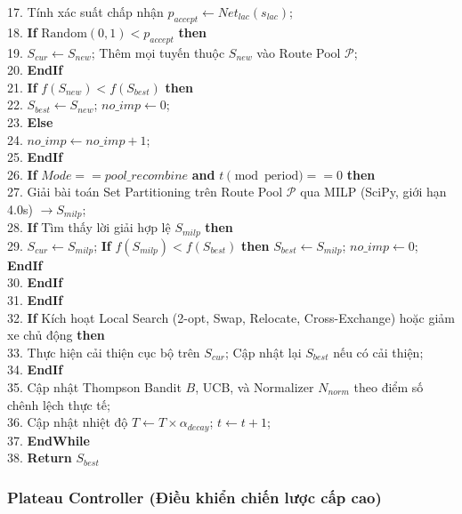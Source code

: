 \documentclass[13pt,a4paper]{extarticle}
\begin{document}
\begin{tabbing}
17. \qquad Tính xác suất chấp nhận $p_{accept} \leftarrow Net_{lac}(s_{lac})$; \\
18. \qquad \textbf{If} $\text{Random}(0, 1) < p_{accept}$ \textbf{then} \\
19. \qquad\qquad $S_{cur} \leftarrow S_{new}$; Thêm mọi tuyến thuộc $S_{new}$ vào Route Pool $\mathcal{P}$; \\
20. \qquad \textbf{EndIf} \\
21. \qquad \textbf{If} $f(S_{new}) < f(S_{best})$ \textbf{then} \\
22. \qquad\qquad $S_{best} \leftarrow S_{new}$; $no\_imp \leftarrow 0$; \\
23. \qquad \textbf{Else} \\
24. \qquad\qquad $no\_imp \leftarrow no\_imp + 1$; \\
25. \qquad \textbf{EndIf} \\
26. \qquad \textbf{If} $Mode == pool\_recombine$ \textbf{and} $t \pmod{\text{period}} == 0$ \textbf{then} \\
27. \qquad\qquad Giải bài toán Set Partitioning trên Route Pool $\mathcal{P}$ qua MILP (SciPy, giới hạn 4.0s) $\to S_{milp}$; \\
28. \qquad\qquad \textbf{If} Tìm thấy lời giải hợp lệ $S_{milp}$ \textbf{then} \\
29. \qquad\qquad\qquad $S_{cur} \leftarrow S_{milp}$; \textbf{If} $f(S_{milp}) < f(S_{best})$ \textbf{then} $S_{best} \leftarrow S_{milp}$; $no\_imp \leftarrow 0$; \textbf{EndIf} \\
30. \qquad\qquad \textbf{EndIf} \\
31. \qquad \textbf{EndIf} \\
32. \qquad \textbf{If} Kích hoạt Local Search (2-opt, Swap, Relocate, Cross-Exchange) hoặc giảm xe chủ động \textbf{then} \\
33. \qquad\qquad Thực hiện cải thiện cục bộ trên $S_{cur}$; Cập nhật lại $S_{best}$ nếu có cải thiện; \\
34. \qquad \textbf{EndIf} \\
35. \qquad Cập nhật Thompson Bandit $B$, UCB, và Normalizer $N_{norm}$ theo điểm số chênh lệch thực tế; \\
36. \qquad Cập nhật nhiệt độ $T \leftarrow T \times \alpha_{decay}$; $t \leftarrow t + 1$; \\
37. \textbf{EndWhile} \\
38. \textbf{Return} $S_{best}$
\end{tabbing}
\endgroup

\clearpage
\subsubsection{Plateau Controller (Điều khiển chiến lược cấp cao)}
\end{document}

